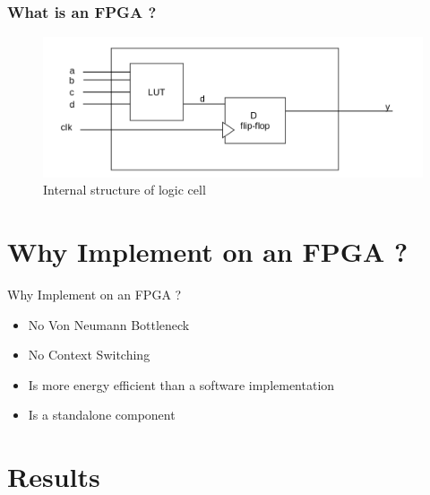 \documentclass[10pt, compress]{beamer}
\begin{document}

\begin{frame}[fragile]
  \frametitle{What is an FPGA ?}
  
  \begin{figure}
  \centering
  \includegraphics[scale=0.35]{logic_cell_structure.png}
  \caption{Internal structure of logic cell}
  \end{figure}
  
\end{frame}


\section{Why Implement on an FPGA ?}

\begin{frame}{Why Implement on an FPGA ?}
    
    \begin{itemize}
        \item No Von Neumann Bottleneck
        \item No Context Switching
        \item Is more energy efficient than a software implementation
        \item Is a standalone component 
    \end{itemize}

\end{frame}

\section{Results}
\end{document}
